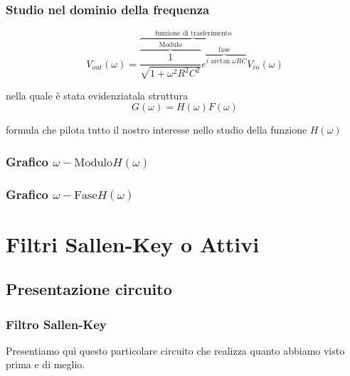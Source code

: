 		\begin{frame}[c]\frametitle{Studio nel dominio della frequenza}
		    
		\begin{equation}
			V_{out}\left (\omega \right)=\overbrace{\overbrace{\frac{1}{\sqrt{1 + \omega^2 R^2 C^2}}}^{\mbox{Modulo}}\overbrace{e^{i \arctan{\omega R C}}}^{\mbox{fase}}}^{\mbox{funzione di trasferimento}} V_{in}\left (\omega \right)			
			\end{equation}


			nella quale è stata evidenziatala struttura
			\begin{equation}
			    \label{eq:Trasferimento in omega}
				G\left(\omega\right)=H\left(\omega\right)F\left(\omega\right)
			\end{equation}

			\pause
			formula che pilota tutto il nostro interesse nello studio della funzione $H\left(\omega \right)$
		
		\end{frame}

		
		\begin{frame}[c]\frametitle{Grafico $\omega-\mbox{Modulo} H\left(\omega \right) $}
		
		
		\end{frame}

		\begin{frame}[c]\frametitle{Grafico $\omega-\mbox{Fase} H\left(\omega \right) $}
		
	
		
		\end{frame}
		

		\section{Filtri Sallen-Key o Attivi} %
		\label{sec:filtri_sallen_key}
		
		
			\subsection{Presentazione circuito} %
			\label{sub:presentazione_circuito}
			
			
			\begin{frame}[c]\frametitle{Filtro Sallen-Key}
			    
				Presentiamo qu\`i questo particolare circuito che realizza quanto abbiamo visto prima e di meglio.\\
				
			\end{frame}

